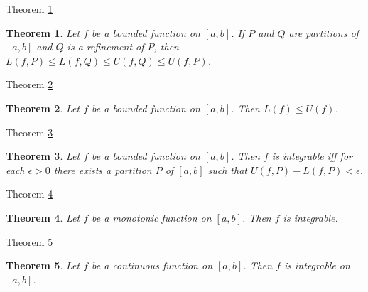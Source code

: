 \documentclass[avery5371,grid]{flashcards}
\newtheorem{theorem}{Theorem}
\begin{document}
\begin{flashcard}[Theorem]{Theorem \ref{thm94}}
\begin{theorem}
\label{thm94}
Let $f$ be a bounded function on $[a,b]$.  If $P$ and $Q$ are partitions
of $[a,b]$ and $Q$ is a refinement of $P$, then $L(f,P) \leq L(f,Q) 
\leq U(f,Q) \leq U(f,P)$.
\end{theorem}
\end{flashcard}

\begin{flashcard}[Theorem]{Theorem \ref{thm95}}
\begin{theorem}
\label{thm95}
Let $f$ be a bounded function on $[a,b]$.  Then $L(f) \leq U(f)$.
\end{theorem}
\end{flashcard}

\begin{flashcard}[Theorem]{Theorem \ref{thm96}}
\begin{theorem}
\label{thm96}
Let $f$ be a bounded function on $[a,b]$.  Then $f$ is integrable iff
for each $\epsilon > 0$ there exists a partition $P$ of $[a,b]$
such that $U(f,P) - L(f,P) < \epsilon$.
\end{theorem}
\end{flashcard}

\begin{flashcard}[Theorem]{Theorem \ref{thm97}}
\begin{theorem}
\label{thm97}
Let $f$ be a monotonic function on $[a,b]$.  Then $f$ is integrable.
\end{theorem}
\end{flashcard}

\begin{flashcard}[Theorem]{Theorem \ref{thm98}}
\begin{theorem}
\label{thm98}
Let $f$ be a continuous function on $[a,b]$.  Then $f$ is integrable
on $[a,b]$.
\end{theorem}
\end{flashcard}
\end{document}
